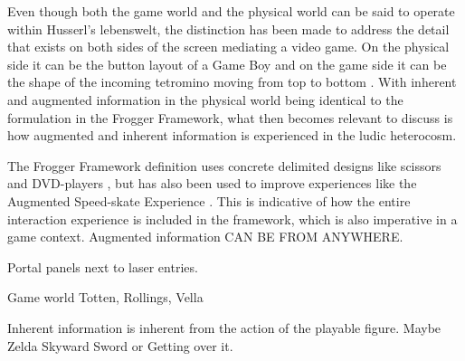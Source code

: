 Even though both the game world and the physical world can be said to operate within Husserl's lebenswelt, the distinction has been made to address the detail that exists on both sides of the screen mediating a video game. On the physical side it can be the button layout of a Game Boy and on the game side it can be the shape of the incoming tetromino moving from top to bottom \cite{tetris}. With inherent and augmented information in the physical world being identical to the formulation in the Frogger Framework, what then becomes relevant to discuss is how augmented and inherent information is experienced in the ludic heterocosm.

The Frogger Framework definition uses concrete delimited designs like scissors and DVD-players \cite{frogger}, but has also been used to improve experiences like the Augmented Speed-skate Experience \cite{transbehav}. This is indicative of how the entire interaction experience is included in the framework, which is also imperative in a game context. Augmented information CAN BE FROM ANYWHERE.

Portal panels next to laser entries.

Game world Totten, Rollings, Vella

Inherent information is inherent from the action of the playable figure. Maybe Zelda Skyward Sword or Getting over it.

